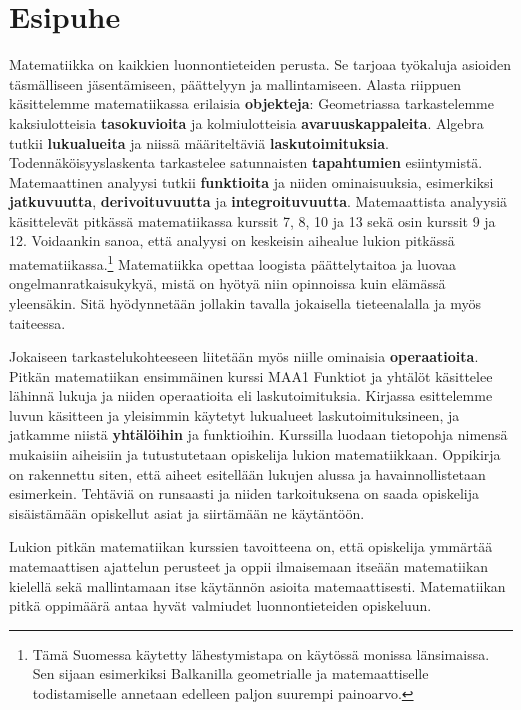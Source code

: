 

\section{Esipuhe}

Matematiikka on kaikkien luonnontieteiden perusta. Se tarjoaa työkaluja asioiden täsmälliseen jäsentämiseen, päättelyyn ja mallintamiseen. Alasta riippuen käsittelemme matematiikassa erilaisia \textbf{objekteja}: Geometriassa tarkastelemme kaksiulotteisia \textbf{tasokuvioita} ja kolmiulotteisia \textbf{avaruuskappaleita}. Algebra tutkii \textbf{lukualueita} ja niissä määriteltäviä \textbf{laskutoimituksia}. Todennäköisyyslaskenta tarkastelee satunnaisten \textbf{tapahtumien} esiintymistä. Matemaattinen analyysi tutkii \textbf{funktioita} ja niiden ominaisuuksia, esimerkiksi \textbf{jatkuvuutta}, \textbf{derivoituvuutta} ja \textbf{integroituvuutta}. Matemaattista analyysiä käsittelevät pitkässä matematiikassa kurssit 7, 8, 10 ja 13 sekä osin kurssit 9 ja 12. Voidaankin sanoa, että analyysi on keskeisin aihealue lukion pitkässä matematiikassa.\footnote[1]{Tämä Suomessa käytetty lähestymistapa on käytössä monissa länsimaissa. Sen sijaan esimerkiksi Balkanilla geometrialle ja matemaattiselle todistamiselle annetaan edelleen paljon suurempi painoarvo.} Matematiikka opettaa loogista päättelytaitoa ja luovaa ongelmanratkaisukykyä, mistä on hyötyä niin opinnoissa kuin elämässä yleensäkin. Sitä hyödynnetään jollakin tavalla jokaisella tieteenalalla ja myös taiteessa. 

Jokaiseen tarkastelukohteeseen liitetään myös niille ominaisia \textbf{operaatioita}. Pitkän matematiikan ensimmäinen kurssi MAA1 Funktiot ja yhtälöt käsittelee lähinnä lukuja ja niiden operaatioita eli laskutoimituksia. Kirjassa esittelemme luvun käsitteen ja yleisimmin käytetyt lukualueet laskutoimituksineen, ja jatkamme niistä \textbf{yhtälöihin} ja funktioihin. Kurssilla luodaan tietopohja nimensä mukaisiin aiheisiin ja tutustutetaan opiskelija lukion matematiikkaan. Oppikirja on rakennettu siten, että aiheet esitellään lukujen alussa ja havainnollistetaan esimerkein. Tehtäviä on runsaasti ja niiden tarkoituksena on saada opiskelija sisäistämään opiskellut asiat ja siirtämään ne käytäntöön.

Lukion pitkän matematiikan kurssien tavoitteena on, että opiskelija ymmärtää matemaattisen ajattelun perusteet ja oppii ilmaisemaan itseään matematiikan kielellä sekä mallintamaan itse käytännön asioita matemaattisesti. Matematiikan pitkä oppimäärä antaa hyvät valmiudet luonnontieteiden opiskeluun.

